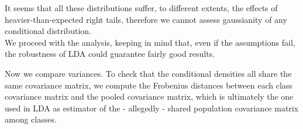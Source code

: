 \documentclass[
  letterpaper,
  DIV=11,
  numbers=noendperiod]{scrartcl}
\newenvironment{Shaded}{\begin{snugshade}}{\end{snugshade}}
\newcommand{\AttributeTok}[1]{\textcolor[rgb]{0.40,0.45,0.13}{#1}}
\newcommand{\CommentTok}[1]{\textcolor[rgb]{0.37,0.37,0.37}{#1}}
\newcommand{\ControlFlowTok}[1]{\textcolor[rgb]{0.00,0.23,0.31}{#1}}
\newcommand{\DecValTok}[1]{\textcolor[rgb]{0.68,0.00,0.00}{#1}}
\newcommand{\FunctionTok}[1]{\textcolor[rgb]{0.28,0.35,0.67}{#1}}
\newcommand{\NormalTok}[1]{\textcolor[rgb]{0.00,0.23,0.31}{#1}}
\newcommand{\OtherTok}[1]{\textcolor[rgb]{0.00,0.23,0.31}{#1}}
\newcommand{\SpecialCharTok}[1]{\textcolor[rgb]{0.37,0.37,0.37}{#1}}
\begin{document}
It seems that all these distributions suffer, to different extents, the
effects of heavier-than-expected right tails, therefore we cannot assess
gaussianity of any conditional distribution.\\
We proceed with the analysis, keeping in mind that, even if the
assumptions fail, the robustness of LDA could guarantee fairly good
results.

Now we compare variances. To check that the conditional densities all
share the same covariance matrix, we compute the Frobenius distances
between each class covariance matrix and the pooled covariance matrix,
which is ultimately the one used in LDA as estimator of the - allegedly
- shared population covariance matrix among classes.

\begin{Shaded}
\end{Shaded}
\end{document}
